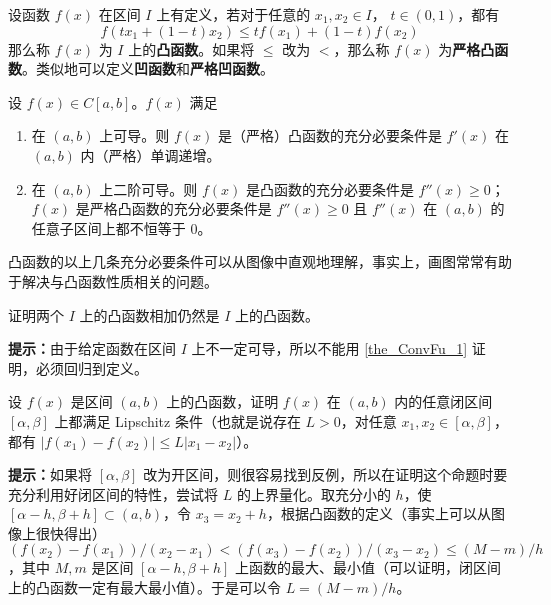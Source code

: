 

设函数 $f(x)$ 在区间 $I$ 上有定义，若对于任意的 $x_1,x_2\in I$， $t\in (0,1)$，都有
\begin{equation}
f(tx_1+(1-t)x_2)\le tf(x_1)+(1-t)f(x_2)
\end{equation}
那么称 $f(x)$ 为 $I$ 上的\textbf{凸函数}。如果将 $\le$ 改为 $<$，那么称 $f(x)$ 为\textbf{严格凸函数}。类似地可以定义\textbf{凹函数}和\textbf{严格凹函数}。
\begin{theorem}{}\label{the_ConvFu_1}
设 $f(x)\in C[a,b]$。$f(x)$ 满足
\begin{enumerate}
\item 在 $(a,b)$ 上可导。则 $f(x)$ 是（严格）凸函数的充分必要条件是 $f'(x)$ 在 $(a,b)$ 内（严格）单调递增。
\item 在 $(a,b)$ 上二阶可导。则 $f(x)$ 是凸函数的充分必要条件是 $f''(x)\ge 0$；$f(x)$ 是严格凸函数的充分必要条件是 $f''(x)\ge 0$ 且 $f''(x)$ 在 $(a,b)$ 的任意子区间上都不恒等于 $0$。
\end{enumerate}
\end{theorem}
凸函数的以上几条充分必要条件可以从图像中直观地理解，事实上，画图常常有助于解决与凸函数性质相关的问题。
\begin{exercise}{}
证明两个 $I$ 上的凸函数相加仍然是 $I$ 上的凸函数。

\textbf{提示：}由于给定函数在区间 $I$ 上不一定可导，所以不能用  
\autoref{the_ConvFu_1} 证明，必须回归到定义。
\end{exercise}
\begin{exercise}{}
设 $f(x)$ 是区间 $(a,b)$ 上的凸函数，证明 $f(x)$ 在 $(a,b)$ 内的任意闭区间 $[\alpha,\beta]$ 上都满足 Lipschitz 条件（也就是说存在 $L>0$，对任意 $x_1,x_2\in [\alpha,\beta]$，都有 $|f(x_1)-f(x_2)|\le L|x_1-x_2|$）。

\textbf{提示：}如果将 $[\alpha,\beta]$ 改为开区间，则很容易找到反例，所以在证明这个命题时要充分利用好闭区间的特性，尝试将 $L$ 的上界量化。取充分小的 $h$，使 $[\alpha-h,\beta+h]\subset (a,b)$，令 $x_3=x_2+h$，根据凸函数的定义（事实上可以从图像上很快得出）$(f(x_2)-f(x_1))/(x_2-x_1)<(f(x_3)-f(x_2))/(x_3-x_2)\le (M-m)/h$，其中 $M,m$ 是区间 $[\alpha-h,\beta+h]$ 上函数的最大、最小值（可以证明，闭区间上的凸函数一定有最大最小值）。于是可以令 $L=(M-m)/h$。
\end{exercise}

